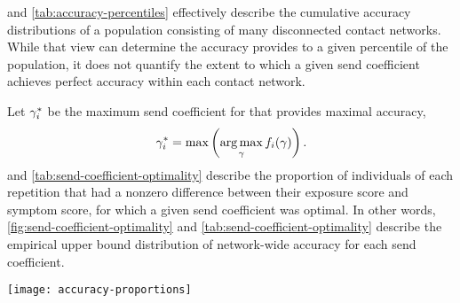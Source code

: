  and \cref{tab:accuracy-percentiles} effectively describe the cumulative accuracy distributions of a population consisting of many disconnected contact networks. While that view can determine the accuracy  provides to a given percentile of the population, it does not quantify the extent to which a given send coefficient achieves perfect accuracy within each contact network. 

Let $\gamma_i^*$ be the maximum send coefficient for  that provides maximal accuracy,
\begin{equation*}
  \gamma_i^* = \max \left(\underset{\gamma}{\operatorname{\arg\max}} \, f_i(\gamma)\right).
\end{equation*}
 and \cref{tab:send-coefficient-optimality} describe the proportion of individuals of each repetition that had a nonzero difference between their exposure score and symptom score, for which a given send coefficient was optimal. In other words, \cref{fig:send-coefficient-optimality} and \cref{tab:send-coefficient-optimality} describe the empirical upper bound distribution of network-wide accuracy for each send coefficient.

\begin{sidewaysfigure}[htbp]
  \centering
  \texttt{[image: accuracy-proportions]}
  \caption[Send coefficient optimality distributions]{Send coefficient optimality distributions. The dashed line inside each violin marks the median. The upper and lower dotted lines inside each violin mark the upper and lower quartiles, respectively.}
  \label{fig:send-coefficient-optimality}
\end{sidewaysfigure}

